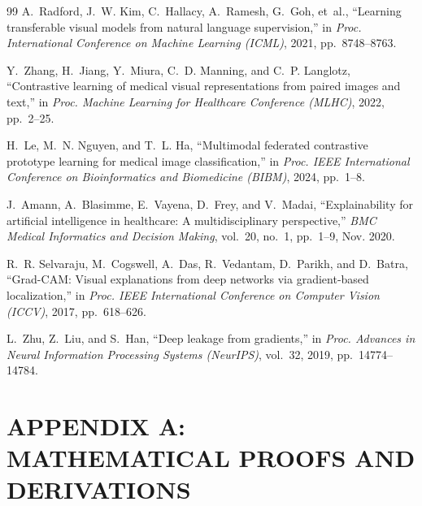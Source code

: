 \documentclass[12pt,a4paper]{amritareport}
\begin{document}
\begin{thebibliography}{99}
A.~Radford, J.~W. Kim, C.~Hallacy, A.~Ramesh, G.~Goh, et~al.,
``Learning transferable visual models from natural language supervision,''
in \textit{Proc. International Conference on Machine Learning (ICML)}, 2021, pp.~8748--8763.

Y.~Zhang, H.~Jiang, Y.~Miura, C.~D. Manning, and C.~P. Langlotz,
``Contrastive learning of medical visual representations from paired images and text,''
in \textit{Proc. Machine Learning for Healthcare Conference (MLHC)}, 2022, pp.~2--25.

H.~Le, M.~N. Nguyen, and T.~L. Ha,
``Multimodal federated contrastive prototype learning for medical image classification,''
in \textit{Proc. IEEE International Conference on Bioinformatics and Biomedicine (BIBM)}, 2024, pp.~1--8.

J.~Amann, A.~Blasimme, E.~Vayena, D.~Frey, and V.~Madai,
``Explainability for artificial intelligence in healthcare: A multidisciplinary perspective,''
\textit{BMC Medical Informatics and Decision Making}, vol.~20, no.~1, pp.~1--9, Nov. 2020.

R.~R. Selvaraju, M.~Cogswell, A.~Das, R.~Vedantam, D.~Parikh, and D.~Batra,
``Grad-CAM: Visual explanations from deep networks via gradient-based localization,''
in \textit{Proc. IEEE International Conference on Computer Vision (ICCV)}, 2017, pp.~618--626.

L.~Zhu, Z.~Liu, and S.~Han,
``Deep leakage from gradients,''
in \textit{Proc. Advances in Neural Information Processing Systems (NeurIPS)}, vol.~32, 2019, pp.~14774--14784.

\end{thebibliography}



\appendix

\chapter*{APPENDIX A: MATHEMATICAL PROOFS AND DERIVATIONS}
\end{document}
